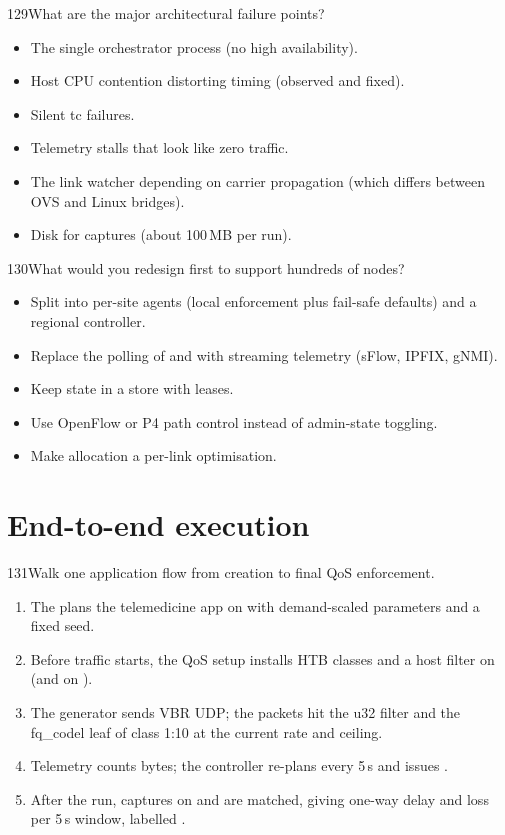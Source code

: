 \begin{qa}{129}{What are the major architectural failure points?}
\begin{itemize}
\item The single orchestrator process (no high availability).
\item Host CPU contention distorting timing (observed and fixed).
\item Silent tc failures.
\item Telemetry stalls that look like zero traffic.
\item The link watcher depending on carrier propagation (which differs between OVS and Linux bridges).
\item Disk for captures (about 100\,MB per run).
\end{itemize}
\end{qa}

\begin{qa}{130}{What would you redesign first to support hundreds of nodes?}
\begin{itemize}
\item Split into per-site agents (local enforcement plus fail-safe defaults) and a regional controller.
\item Replace the polling of  and  with streaming telemetry (sFlow, IPFIX, gNMI).
\item Keep state in a store with leases.
\item Use OpenFlow or P4 path control instead of admin-state toggling.
\item Make allocation a per-link optimisation.
\end{itemize}
\end{qa}

\section{End-to-end execution}

\begin{qa}{131}{Walk one application flow from creation to final QoS enforcement.}
\begin{enumerate}
\item The  plans the telemedicine app on  with demand-scaled parameters and a
fixed seed.
\item Before traffic starts, the QoS setup installs HTB classes and a host filter  on
 (and  on ).
\item The generator sends VBR UDP; the packets hit the u32 filter and the fq\_codel leaf of class 1:10 at the current
rate and ceiling.
\item Telemetry counts bytes; the controller re-plans every 5\,s and issues .
\item After the run, captures on  and  are matched, giving one-way delay and loss per
5\,s window, labelled .
\end{enumerate}
\end{qa}

